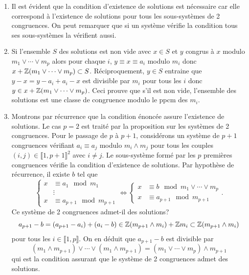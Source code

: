 \begin{demo}
  \begin{enumerate}
    \item Il est évident que la condition d'existence de solutions est nécessaire car elle correspond à l'existence de solutions pour tous les sous-systèmes de 2 congruences. On peut remarquer que si un système vérifie la condition tous ses sous-systèmes la vérifient aussi.
    \item Si l'ensemble $S$ des solutions est non vide avec $x \in S$ et $y$ congrus à $x$ modulo $m_1 \vee \cdots \vee m_p$ alors pour chaque $i$, $y \equiv x \equiv a_i$ modulo $m_i$ donc $x + \mathbb{Z} (m_1 \vee \cdots \vee m_p) \subset S$.\newline
    Réciproquement, $y \in S$ entraine que $y-x = y-a_i + a_i - x$ est divisible par $m_i$ pour tous les $i$ donc $y \in x + \mathbb{Z} (m_1 \vee \cdots \vee m_p)$. Ceci prouve que s'il est non vide, l'ensemble des solutions est une classe de congruence modulo le ppcm des $m_i$.
    \item Montrons par récurrence que la condition  énoncée assure l'existence de solutions. Le cas $p=2$ est traité par la proposition sur les systèmes de 2 congruences.\newline
    Pour le passage de $p$ à $p+1$, considérons un système de $p+1$ congruences vérifiant $a_i \equiv a_j$ modulo $m_i \wedge m_j$ pour tous les couples $(i,j)\in \llbracket 1,  p+1\rrbracket ^2$ avec $i \neq j$.\newline
    Le sous-système formé par les $p$ premières congruences vérifie la condition d'existence de solutions. Par hypothèse de récurrence, il existe $b$ tel que
  \begin{displaymath}
        \left\lbrace
      \begin{align*}
        x &\equiv a_1 \mod m_1 \\
          &\vdots \\
        x &\equiv a_{p+1} \mod m_{p+1}
      \end{align*}
    \right.
    \Leftrightarrow
    \left\lbrace
      \begin{align*}
        x &\equiv b \mod m_1 \vee \cdots \vee m_p \\
        x &\equiv a_{p+1} \mod m_{p+1}
      \end{align*}
    \right. .
  \end{displaymath}
  Ce système de 2 congruences admet-il des solutions?
  \begin{displaymath}
    a_{p+1} - b = (a_{p+1} - a_i) + (a_i - b) \in \mathbb{Z} (m_{p+1} \wedge m_i ) + \mathbb{Z} m_i \subset \mathbb{Z} (m_{p+1} \wedge m_i )
  \end{displaymath}
  pour tous les $i \in \llbracket 1, p \rrbracket$. On en déduit que $a_{p+1} - b$ est divisible par
  \begin{displaymath}
    (m_1 \wedge m_{p+1}) \vee \cdots \vee (m_1 \wedge m_{p+1}) =  (m_1 \vee \cdots \vee m_p) \wedge m_{p+1}
  \end{displaymath}
  qui est la condition assurant que le système de 2 congruences admet des solutions.
  \end{enumerate}
\end{demo}

